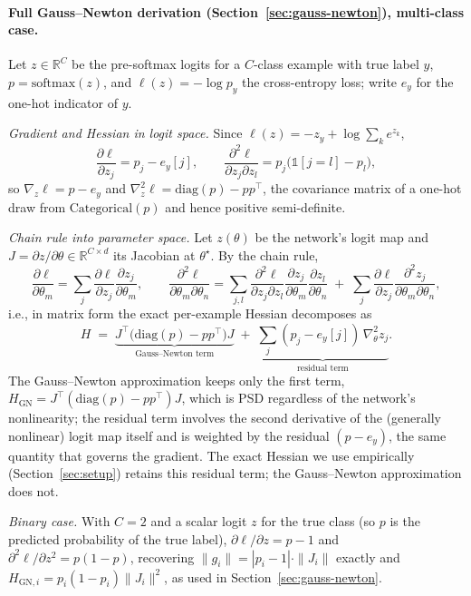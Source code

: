 \documentclass{article}
\newcommand{\RR}{\mathbb{R}}
\newcommand{\theorig}{\theta^\star}
\begin{document}
\paragraph{Full Gauss--Newton derivation (Section~\ref{sec:gauss-newton}), multi-class case.}
Let $z\in\RR^C$ be the pre-softmax logits for a $C$-class example with true label $y$, $p=\mathrm{softmax}(z)$, and $\ell(z) = -\log p_y$ the cross-entropy loss; write $e_y$ for the one-hot indicator of $y$.

\emph{Gradient and Hessian in logit space.} Since $\ell(z) = -z_y + \log\sum_k e^{z_k}$,
\[
\frac{\partial \ell}{\partial z_j} = p_j - e_y[j], \qquad \frac{\partial^2\ell}{\partial z_j\partial z_l} = p_j\big(\mathbb{1}[j=l] - p_l\big),
\]
so $\nabla_z\ell = p-e_y$ and $\nabla^2_z\ell = \mathrm{diag}(p) - pp^\top$, the covariance matrix of a one-hot draw from $\mathrm{Categorical}(p)$ and hence positive semi-definite.

\emph{Chain rule into parameter space.} Let $z(\theta)$ be the network's logit map and $J = \partial z/\partial\theta \in \RR^{C\times d}$ its Jacobian at $\theorig$. By the chain rule,
\[
\frac{\partial \ell}{\partial\theta_m} = \sum_j \frac{\partial\ell}{\partial z_j}\frac{\partial z_j}{\partial\theta_m}, \qquad
\frac{\partial^2\ell}{\partial\theta_m\partial\theta_n} = \sum_{j,l}\frac{\partial^2\ell}{\partial z_j\partial z_l}\frac{\partial z_j}{\partial\theta_m}\frac{\partial z_l}{\partial\theta_n} \;+\; \sum_j \frac{\partial\ell}{\partial z_j}\frac{\partial^2 z_j}{\partial\theta_m\partial\theta_n},
\]
i.e., in matrix form the exact per-example Hessian decomposes as
\[
H \;=\; \underbrace{J^\top\big(\mathrm{diag}(p)-pp^\top\big)J}_{\text{Gauss--Newton term}} \;+\; \underbrace{\textstyle\sum_j (p_j - e_y[j])\,\nabla^2_\theta z_j}_{\text{residual term}} .
\]
The Gauss--Newton approximation keeps only the first term, $H_{\mathrm{GN}} = J^\top(\mathrm{diag}(p)-pp^\top)J$, which is PSD regardless of the network's nonlinearity; the residual term involves the second derivative of the (generally nonlinear) logit map itself and is weighted by the residual $(p-e_y)$, the same quantity that governs the gradient. The exact Hessian we use empirically (Section~\ref{sec:setup}) retains this residual term; the Gauss--Newton approximation does not.

\emph{Binary case.} With $C=2$ and a scalar logit $z$ for the true class (so $p$ is the predicted probability of the true label), $\partial\ell/\partial z = p-1$ and $\partial^2\ell/\partial z^2 = p(1-p)$, recovering $\|g_i\| = |p_i-1|\cdot\|J_i\|$ exactly and $H_{\mathrm{GN},i} = p_i(1-p_i)\|J_i\|^2$, as used in Section~\ref{sec:gauss-newton}.
\end{document}
